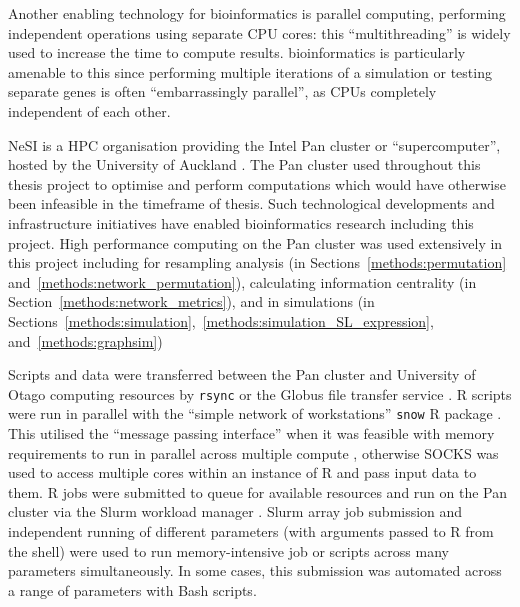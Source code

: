 Another enabling technology for \gls{bioinformatics} is parallel computing, performing independent operations using separate \gls{CPU} cores: this ``multithreading'' is widely used to increase the time to compute results. \Gls{bioinformatics} is particularly amenable to this since performing multiple iterations of a simulation or testing separate genes is often ``embarrassingly parallel'', as \glspl{CPU} completely independent of each other. %

\Gls{NeSI} is a \gls{HPC} organisation providing the Intel Pan cluster or ``supercomputer'', hosted by the University of Auckland \citep{NeSI}. The Pan cluster used throughout this thesis project to optimise and perform computations which would have otherwise been infeasible in the timeframe of thesis. Such technological developments and infrastructure initiatives have enabled \gls{bioinformatics} research including this project.  High performance computing on the Pan cluster was used extensively in this project including for resampling analysis (in Sections~\ref{methods:permutation} and~\ref{methods:network_permutation}), calculating \gls{information centrality} (in Section~\ref{methods:network_metrics}), and in simulations (in Sections~\ref{methods:simulation},~\ref{methods:simulation_SL_expression}, and~\ref{methods:graphsim})

Scripts and data were transferred between the Pan cluster and University of Otago computing resources by \texttt{rsync} or the Globus file transfer service \citep{Globus}. R scripts \citep{R_core} were run in parallel with the ``simple network of workstations'' \texttt{snow} R package \citet{snow}. This utilised the ``message passing interface'' \citep{Rmpi} when it was feasible with memory requirements to run in parallel across multiple compute , otherwise \gls{SOCKS} was used to access multiple cores within an instance of R and pass input data to them. R jobs were submitted to queue for available resources and run on the Pan cluster via the \gls{Slurm} workload manager \citep{slurm}.  \gls{Slurm} array job submission and independent running of different parameters (with arguments passed to R from the shell) were used to run memory-intensive job or scripts across many parameters simultaneously. In some cases, this submission was automated across a range of parameters with \gls{Bash} scripts.

